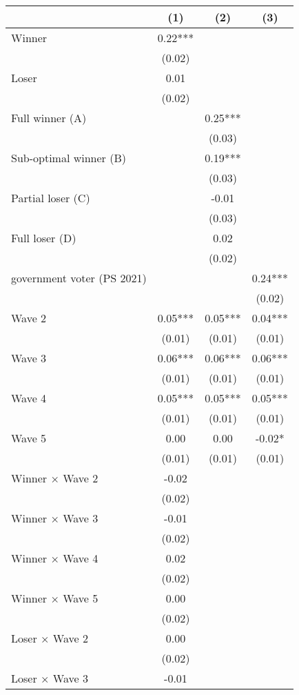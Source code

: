 \begin{table}
\centering
\begin{tabular}[t]{lccc}
\toprule
  & (1) & (2) & (3)\\
\midrule
Winner & 0.22*** &  & \\
 & (0.02) &  \vphantom{9} & \\
Loser & 0.01 &  & \\
 & (0.02) &  \vphantom{8} & \\
Full winner (A) &  & 0.25*** & \\
 &  & (0.03) \vphantom{2} & \\
Sub-optimal winner (B) &  & 0.19*** & \\
 &  & (0.03) \vphantom{1} & \\
Partial loser (C) &  & -0.01 & \\
 &  & (0.03) & \\
Full loser (D) &  & 0.02 & \\
 &  & (0.02) \vphantom{16} & \\
government voter (PS 2021) &  &  & 0.24***\\
 &  &  & \vphantom{4} (0.02)\\
Wave 2 & 0.05*** & 0.05*** & 0.04***\\
 & (0.01) & (0.01) & \vphantom{3} (0.01)\\
Wave 3 & 0.06*** & 0.06*** & 0.06***\\
 & (0.01) & (0.01) & \vphantom{2} (0.01)\\
Wave 4 & 0.05*** & 0.05*** & 0.05***\\
 & (0.01) & (0.01) & \vphantom{1} (0.01)\\
Wave 5 & 0.00 & 0.00 & -0.02*\\
 & (0.01) & (0.01) & (0.01)\\
Winner × Wave 2 & -0.02 &  & \\
 & (0.02) &  \vphantom{7} & \\
Winner × Wave 3 & -0.01 &  & \\
 & (0.02) &  \vphantom{6} & \\
Winner × Wave 4 & 0.02 &  & \\
 & (0.02) &  \vphantom{5} & \\
Winner × Wave 5 & 0.00 &  & \\
 & (0.02) &  \vphantom{4} & \\
Loser × Wave 2 & 0.00 &  & \\
 & (0.02) &  \vphantom{3} & \\
Loser × Wave 3 & -0.01 &  & \\

\end{tabular}
\end{table}
